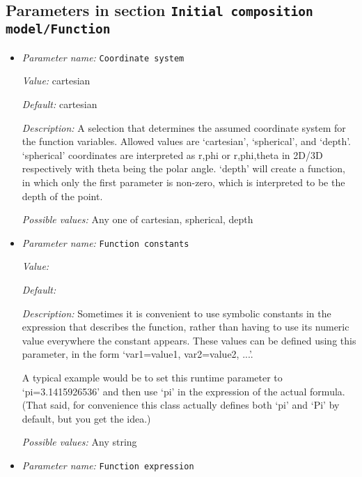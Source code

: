 \subsection{Parameters in section \tt Initial composition model/Function}
\label{parameters:Initial_20composition_20model/Function}

\begin{itemize}
\item {\it Parameter name:} {\tt Coordinate system}
\label{parameters:Initial composition model/Function/Coordinate system}
\label{parameters:Initial_20composition_20model/Function/Coordinate_20system}


{\it Value:} cartesian


{\it Default:} cartesian


{\it Description:} A selection that determines the assumed coordinate system for the function variables. Allowed values are `cartesian', `spherical', and `depth'. `spherical' coordinates are interpreted as r,phi or r,phi,theta in 2D/3D respectively with theta being the polar angle. `depth' will create a function, in which only the first parameter is non-zero, which is interpreted to be the depth of the point.


{\it Possible values:} Any one of cartesian, spherical, depth
\item {\it Parameter name:} {\tt Function constants}
\label{parameters:Initial composition model/Function/Function constants}
\label{parameters:Initial_20composition_20model/Function/Function_20constants}


{\it Value:} 


{\it Default:} 


{\it Description:} Sometimes it is convenient to use symbolic constants in the expression that describes the function, rather than having to use its numeric value everywhere the constant appears. These values can be defined using this parameter, in the form `var1=value1, var2=value2, ...'.

A typical example would be to set this runtime parameter to `pi=3.1415926536' and then use `pi' in the expression of the actual formula. (That said, for convenience this class actually defines both `pi' and `Pi' by default, but you get the idea.)


{\it Possible values:} Any string
\item {\it Parameter name:} {\tt Function expression}
\label{parameters:Initial composition model/Function/Function expression}
\label{parameters:Initial_20composition_20model/Function/Function_20expression}



\end{itemize}
